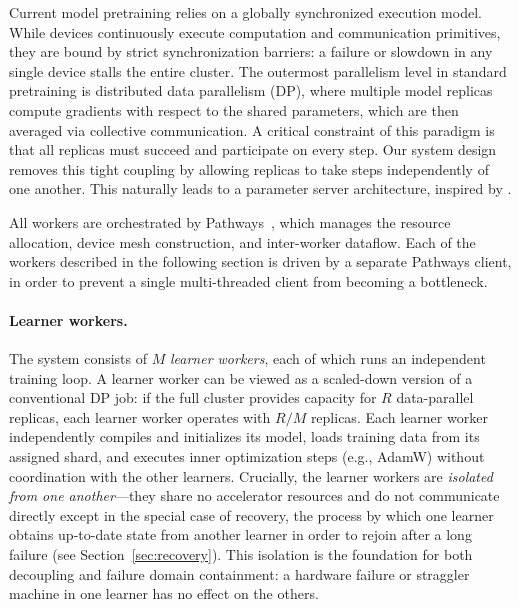 \documentclass[11pt, a4paper, twocolumn, copyright, google]{google}
\begin{document}
Current model pretraining relies on a globally synchronized execution model. While devices continuously execute computation and communication primitives, they are bound by strict synchronization barriers: a failure or slowdown in any single device stalls the entire cluster. The outermost parallelism level in standard pretraining is distributed data parallelism (DP), where multiple model replicas compute gradients with respect to the shared parameters, which are then averaged via collective communication. A critical constraint of this paradigm is that all replicas must succeed and participate on every step. Our system design removes this tight coupling by allowing replicas to take steps independently of one another. This naturally leads to a parameter server architecture, inspired by \citep{dean2012large}.

All workers are orchestrated by Pathways~\citep{barham2022pathways}, which manages the resource allocation, device mesh construction, and inter-worker dataflow. Each of the workers described in the following section is driven by a separate Pathways client, in order to prevent a single multi-threaded client from becoming a bottleneck.

\paragraph{Learner workers.}

The system consists of $M$ \emph{learner workers}, each of which runs an independent training loop. A learner worker can be viewed as a scaled-down version of a conventional DP job: if the full cluster provides capacity for $R$ data-parallel replicas, each learner worker operates with $R / M$ replicas. Each learner worker independently compiles and initializes its model, loads training data from its assigned shard, and executes inner optimization steps (e.g., AdamW) without coordination with the other learners. Crucially, the learner workers are \emph{isolated from one another}---they share no accelerator resources and do not communicate directly except in the special case of recovery, the process by which one learner obtains up-to-date state from another learner in order to rejoin after a long failure (see Section~\ref{sec:recovery}). This isolation is the foundation for both decoupling and failure domain containment: a hardware failure or straggler machine in one learner has no effect on the others.
\end{document}
